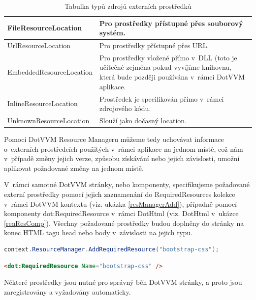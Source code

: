 \begin{table}[H]
	\caption{Tabulka typů zdrojů externích prostředků}
	\label{resLocTable}
	\centering
	\begin{tabular}{m{12em}|m{22em}}
		\toprule
FileResourceLocation           & Pro prostředky přístupné přes souborový systém. \\ \midrule
UrlResourceLocation           & Pro prostředky přístupné přes URL.\\ \midrule
EmbeddedResourceLocation           & Pro prostředky vložené přímo v~DLL (toto je učitečné zejména pokud vyvíjíme knihovnu, která bude později používána v~rámci DotVVM aplikace. \\ \midrule
InlineResourceLocation           & Prostředek je specifikován přímo v~rámci zdrojového kódu. \\ \midrule
UnknownResourceLocation           & Slouží jako dočasný location. \\
\bottomrule
\end{tabular}
\end{table}
Pomocí DotVVM Resource Manageru můžeme tedy uchovávat informace o~externích prostředcích použitých v~rámci aplikace na jednom místě, což nám v~případě změny jejich verze, způsobu získávání nebo jejich závislosti, umožní aplikovat požadované změny na jednom místě.

V~rámci samotné DotVVM stránky, nebo komponenty, specifikujeme požadované externí prostředky pomocí jejich zaznamenání do RequiredResources kolekce v~rámci DotVVM kontextu (viz. ukázka \ref{resManagerAdd}), případně pomocí komponenty dot:RequiredResource v~rámci DotHtml (viz. DotHtml v~ukázce \ref{reqResComp}).
Všechny požadované prostředky budou doplněny do stránky na konec HTML tagu head nebo body v~závislosti na jejich typu.

\begin{lstlisting}[language=c#, caption=Specifikace požadovaného prostředku v~rámci C# kódu,label=resManagerAdd,captionpos=t]
context.ResourceManager.AddRequiredResource("bootstrap-css");

\end{lstlisting}

\begin{lstlisting}[language=Html, caption=Specifikace požadovaného prostředku v~rámci DotHtml,label=reqResComp,captionpos=t]
<dot:RequiredResource Name="bootstrap-css" />

\end{lstlisting}
Některé prostředky jsou nutné pro správný běh DotVVM stránky, a proto jsou zaregistrovány a vyžadovány automaticky.

